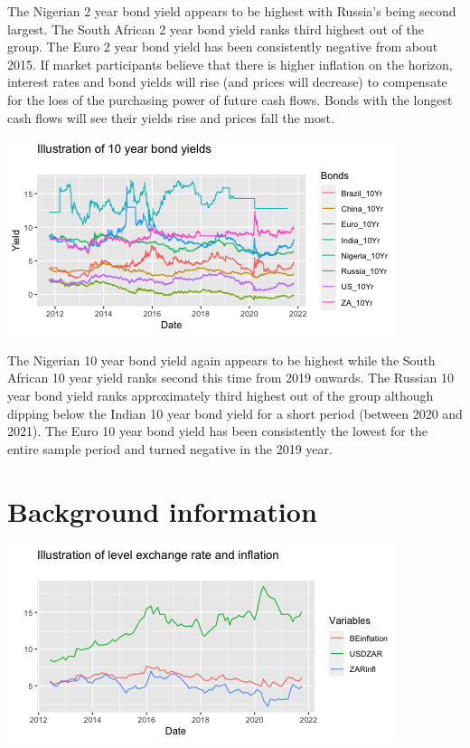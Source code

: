 \documentclass[11pt,preprint, authoryear]{elsarticle}
\let\origfigure\figure
\let\endorigfigure\endfigure
\renewenvironment{figure}[1][2] {
    \expandafter\origfigure\expandafter[H]
} {
    \endorigfigure
}
\numberwithin{equation}{section}
\numberwithin{figure}{section}
\numberwithin{table}{section}
\begin{document}
The Nigerian 2 year bond yield appears to be highest with Russia's being
second largest. The South African 2 year bond yield ranks third highest
out of the group. The Euro 2 year bond yield has been consistently
negative from about 2015. If market participants believe that there is
higher inflation on the horizon, interest rates and bond yields will
rise (and prices will decrease) to compensate for the loss of the
purchasing power of future cash flows. Bonds with the longest cash flows
will see their yields rise and prices fall the most.

\begin{figure}[H]

{\centering \includegraphics{Question2_files/figure-latex/Figure6-1} 

}

\caption{Caption Here \label{Figure6}}\label{fig:Figure6}
\end{figure}

The Nigerian 10 year bond yield again appears to be highest while the
South African 10 year yield ranks second this time from 2019 onwards.
The Russian 10 year bond yield ranks approximately third highest out of
the group although dipping below the Indian 10 year bond yield for a
short period (between 2020 and 2021). The Euro 10 year bond yield has
been consistently the lowest for the entire sample period and turned
negative in the 2019 year.

\hypertarget{background-information}{%
\section{\texorpdfstring{Background information
\label{Background}}{Background information }}\label{background-information}}

\begin{figure}[H]

{\centering \includegraphics{Question2_files/figure-latex/Figure7-1} 

}

\caption{Caption Here \label{Figure7}}\label{fig:Figure7}
\end{figure}
\end{document}
